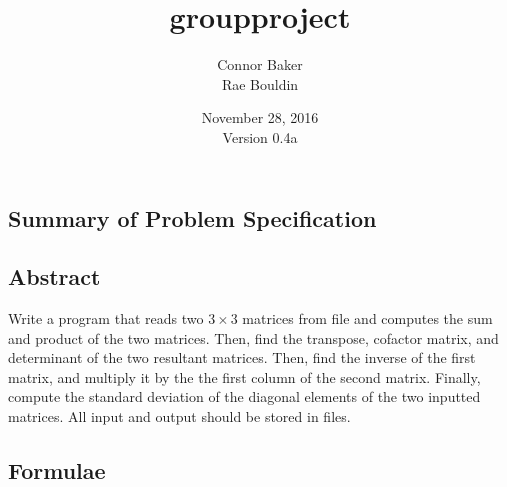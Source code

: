 \documentclass[12pt]{article}
\begin{document}
\null
\nointerlineskip 
\vfill
\let \snewpage \newpage
\let \newpage \relax
    \title{groupproject}
    \author{Connor Baker\\Rae Bouldin}
    \date{November 28, 2016\\Version 0.4a}
\maketitle
\let \newpage \snewpage
\vfill
\thispagestyle{empty}



\newpage %



\makeatletter
{}
\makeatother
\tableofcontents

\clearpage
{}

\begin{center}
\section{Summary of Problem Specification}
\end{center}
\subsection{Abstract}
Write a program that reads two $3\times3$ matrices from file and computes the sum and product of the two matrices. Then, find the transpose, cofactor matrix, and determinant of the two resultant matrices. Then, find the inverse of the first matrix, and multiply it by the the first column of the second matrix. Finally, compute the standard deviation of the diagonal elements of the two inputted matrices.
All input and output should be stored in files.



\newpage %



\begin{center}
\section{Formulae}
\end{center}
\end{document}
